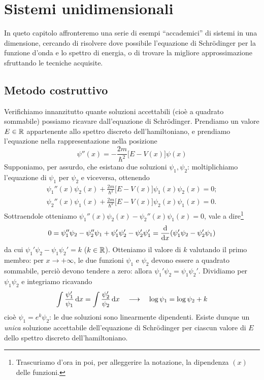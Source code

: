 \chapter{Sistemi unidimensionali}
In queto capitolo affronteremo una serie di esempi ``accademici'' di sistemi in una dimensione, cercando di risolvere dove possibile l'equazione di Schr\"odinger per la funzione d'onda e lo spettro di energia, o di trovare la migliore approssimazione sfruttando le tecniche acquisite.

\section{Metodo costruttivo}
Verifichiamo innanzitutto quante soluzioni accettabili (cioè a quadrato sommabile) possiamo ricavare dall'equazione di Schr\"odinger.
Prendiamo un valore $E\in\mathbb{R}$ appartenente allo spettro discreto dell'hamiltoniano, e prendiamo l'equazione nella rappresentazione nella posizione
\begin{equation}
	\psi''(x)=-\frac{2m}{\hbar^2}\big[E-V(x)\big]\psi(x)
	\label{eq:schroedinger-coordinate}
\end{equation}
Supponiamo, per assurdo, che esistano due soluzioni $\psi_1,\psi_2$: moltiplichiamo l'equazione di $\psi_1$ per $\psi_2$ e viceversa, ottenendo
\begin{equation}
	\begin{gathered}
		\psi_1''(x)\psi_2(x)+\frac{2m}{\hbar^2}\big[E-V(x)\big]\psi_1(x)\psi_2(x)=0;\\
		\psi_2''(x)\psi_1(x)+\frac{2m}{\hbar^2}\big[E-V(x)\big]\psi_2(x)\psi_1(x)=0.
	\end{gathered}
\end{equation}
Sottraendole otteniamo $\psi_1''(x)\psi_2(x)-\psi_2''(x)\psi_1(x)=0$, vale a dire\footnote{Trascuriamo d'ora in poi, per alleggerire la notazione, la dipendenza $(x)$ delle funzioni.}
\begin{equation}
	0=\psi_1''\psi_2-\psi_2''\psi_1+\psi_1'\psi_2'-\psi_2'\psi_1'=\frac{\textup{d} {}}{\textup{d} {x}}(\psi_1'\psi_2-\psi_2'\psi_1)
\end{equation}
da cui $\psi_1'\psi_2-\psi_1\psi_2'=k$ ($k\in\mathbb{R}$).
Otteniamo il valore di $k$ valutando il primo membro: per $x\to+\infty$, le due funzioni $\psi_1$ e $\psi_2$ devono essere a quadrato sommabile, perciò devono tendere a zero: allora $\psi_1'\psi_2=\psi_1\psi_2'$.
Dividiamo per $\psi_1\psi_2$ e integriamo ricavando
\begin{equation}
	\int\frac{\psi_1'}{\psi_1}\,\textup{d} x=\int\frac{\psi_2'}{\psi_2}\,\textup{d} x\quad\longrightarrow\quad\log\psi_1=\log\psi_2+k
\end{equation}
cioè $\psi_1=e^k\psi_2$: le due soluzioni sono linearmente dipendenti.
Esiste dunque un \emph{unica} soluzione accettabile dell'equazione di Schr\"odinger per ciascun valore di $E$ dello spettro discreto dell'hamiltoniano.

